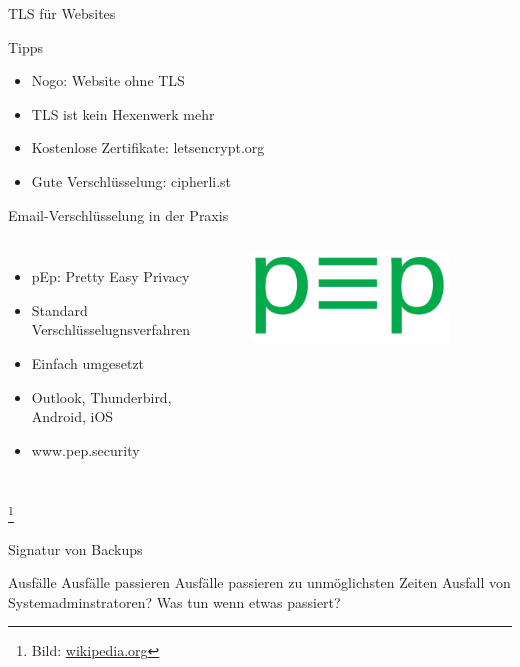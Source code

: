 \documentclass[10pt]{beamer}
\newcommand\blfootnote[1]{%
	\begingroup
	\renewcommand\thefootnote{}\footnote{#1}%
	\addtocounter{footnote}{-1}%
	\endgroup
}
\begin{document}
\begin{frame}[fragile]{TLS für Websites}
\begin{alertblock}{Tipps}
\end{alertblock}
	\begin{itemize}
	\item Nogo: Website ohne TLS
	\item TLS ist kein Hexenwerk mehr
	\item Kostenlose Zertifikate: letsencrypt.org
	\item Gute Verschlüsselung: cipherli.st
\end{itemize}
\end{frame}

\begin{frame}[fragile]{Email-Verschlüsselung in der Praxis}
\begin{columns}[T,c,onlytextwidth]
	\begin{itemize}
		\item pEp: Pretty Easy Privacy
		\item Standard Verschlüsselugnsverfahren
		\item Einfach umgesetzt
		\item Outlook, Thunderbird, Android, iOS
		\item www.pep.security
	\end{itemize}
	\begin{figure}
		\includegraphics[width=0.9\textwidth]{images/pep}
	\end{figure}
\end{columns}
\blfootnote{Bild: \href{https://de.wikipedia.org/wiki/Pretty_Easy_privacy}{wikipedia.org}}
\end{frame}

\begin{frame}[fragile]{Signatur von Backups}
\begin{alertblock}{Ausfälle}
	Ausfälle passieren
	Ausfälle passieren zu unmöglichsten Zeiten
	Ausfall von Systemadminstratoren?
	Was tun wenn etwas passiert?
\end{alertblock}
\end{frame}
\end{document}
